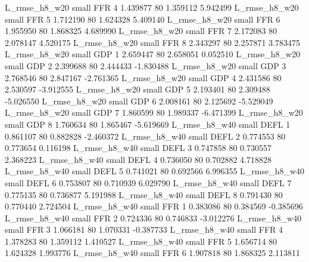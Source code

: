  L_rmse_h8_w20      small      FFR                 4 1.439877 80       1.359112           5.942499
 L_rmse_h8_w20      small      FFR                 5 1.712190 80       1.624328           5.409140
 L_rmse_h8_w20      small      FFR                 6 1.955950 80       1.868325           4.689990
 L_rmse_h8_w20      small      FFR                 7 2.172083 80       2.078147           4.520175
 L_rmse_h8_w20      small      FFR                 8 2.343297 80       2.257871           3.783475
 L_rmse_h8_w20      small      GDP                 1 2.659447 80       2.658051           0.052510
 L_rmse_h8_w20      small      GDP                 2 2.399688 80       2.444433          -1.830488
 L_rmse_h8_w20      small      GDP                 3 2.768546 80       2.847167          -2.761365
 L_rmse_h8_w20      small      GDP                 4 2.431586 80       2.530597          -3.912555
 L_rmse_h8_w20      small      GDP                 5 2.193401 80       2.309488          -5.026550
 L_rmse_h8_w20      small      GDP                 6 2.008161 80       2.125692          -5.529049
 L_rmse_h8_w20      small      GDP                 7 1.860599 80       1.989337          -6.471399
 L_rmse_h8_w20      small      GDP                 8 1.760634 80       1.865467          -5.619669
 L_rmse_h8_w40      small     DEFL                 1 0.861107 80       0.882828          -2.460372
 L_rmse_h8_w40      small     DEFL                 2 0.774553 80       0.773654           0.116198
 L_rmse_h8_w40      small     DEFL                 3 0.747858 80       0.730557           2.368223
 L_rmse_h8_w40      small     DEFL                 4 0.736050 80       0.702882           4.718828
 L_rmse_h8_w40      small     DEFL                 5 0.741021 80       0.692566           6.996355
 L_rmse_h8_w40      small     DEFL                 6 0.753807 80       0.710939           6.029790
 L_rmse_h8_w40      small     DEFL                 7 0.775135 80       0.736877           5.191988
 L_rmse_h8_w40      small     DEFL                 8 0.791430 80       0.770440           2.724504
 L_rmse_h8_w40      small      FFR                 1 0.383086 80       0.384569          -0.385696
 L_rmse_h8_w40      small      FFR                 2 0.724336 80       0.746833          -3.012276
 L_rmse_h8_w40      small      FFR                 3 1.066181 80       1.070331          -0.387733
 L_rmse_h8_w40      small      FFR                 4 1.378283 80       1.359112           1.410527
 L_rmse_h8_w40      small      FFR                 5 1.656714 80       1.624328           1.993776
 L_rmse_h8_w40      small      FFR                 6 1.907818 80       1.868325           2.113811
